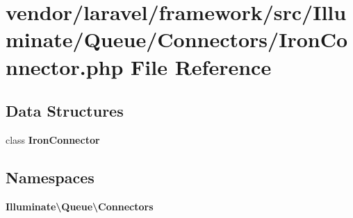 \section{vendor/laravel/framework/src/\+Illuminate/\+Queue/\+Connectors/\+Iron\+Connector.php File Reference}
\label{_iron_connector_8php}
\subsection*{Data Structures}
\begin{DoxyCompactItemize}
\item 
class {\bf Iron\+Connector}
\end{DoxyCompactItemize}
\subsection*{Namespaces}
\begin{DoxyCompactItemize}
\item 
 {\bf Illuminate\textbackslash{}\+Queue\textbackslash{}\+Connectors}
\end{DoxyCompactItemize}
